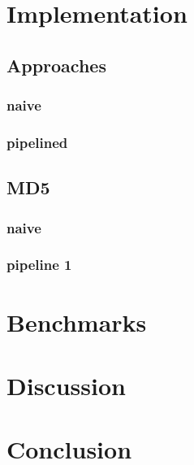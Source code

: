 \documentclass[a4paper]{article}
\begin{document}
\section{Implementation}
\label{sec:orgf2ab9ee}

\subsection{Approaches}
\label{sec:org0449511}

\subsubsection{naive}
\label{sec:org2ecad95}

\subsubsection{pipelined}
\label{sec:orga76d364}

\subsection{MD5}
\label{sec:org6a8463c}

\subsubsection{naive}
\label{sec:orge1d8d00}

\subsubsection{pipeline 1}
\label{sec:org9bb9b3c}

\section{Benchmarks}
\label{sec:org096ab92}

\section{Discussion}
\label{sec:org1300ea2}

\section{Conclusion}
\label{sec:orgaa3a7f6}




\begin{appendix}

\end{appendix}
\end{document}
